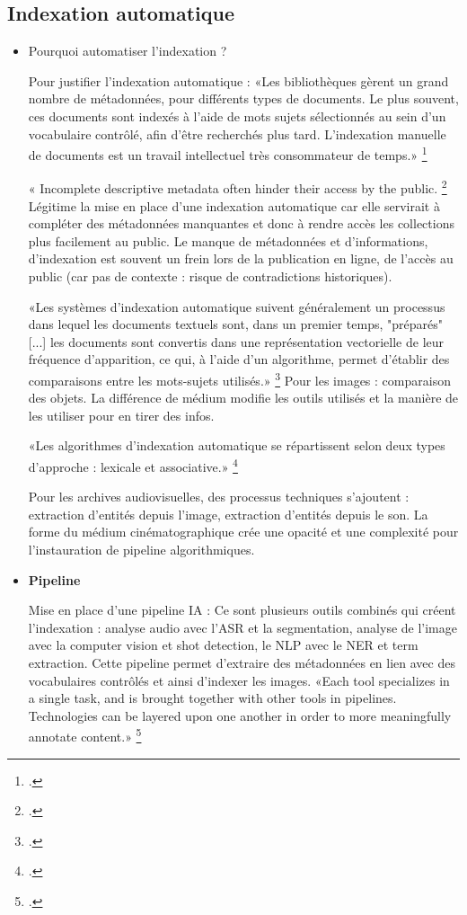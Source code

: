 \subsection{Indexation automatique}

\begin{itemize}
	\item Pourquoi automatiser l'indexation ?

Pour justifier l'indexation automatique : 
«Les bibliothèques gèrent un grand nombre de métadonnées, pour différents types de documents. Le plus souvent, ces documents sont indexés à l'aide de mots sujets sélectionnés au sein d'un vocabulaire contrôlé, afin d'être recherchés plus tard. L'indexation manuelle de documents est un travail intellectuel très consommateur de temps.»
\footcite[p.~21]{suominen2019a}

« Incomplete descriptive metadata often hinder their access by the public. \footcite{sullivan2025}
Légitime la mise en place d'une indexation automatique car elle servirait à compléter des métadonnées manquantes et donc à rendre accès les collections plus facilement au public. Le manque de métadonnées et d'informations, d'indexation est souvent un frein lors de la publication en ligne, de l'accès au public (car pas de contexte : risque de contradictions historiques). 

«Les systèmes d'indexation automatique suivent généralement un processus dans lequel les documents textuels sont, dans un premier temps, "préparés" [...] les documents sont convertis dans une représentation vectorielle de leur fréquence d'apparition, ce qui, à l'aide d'un algorithme, permet d'établir des comparaisons entre les mots-sujets utilisés.»
\footcite[p.~21]{suominen2019a}
Pour les images : comparaison des objets. La différence de médium modifie les outils utilisés et la manière de les utiliser pour en tirer des infos. 

«Les algorithmes d'indexation automatique se répartissent selon deux types d'approche : lexicale et associative.»
\footcite[p.~21]{suominen2019a}

Pour les archives audiovisuelles, des processus techniques s'ajoutent : extraction d'entités depuis l'image, extraction d'entités depuis le son. La forme du médium cinématographique crée une opacité et une complexité pour l'instauration de pipeline algorithmiques.

\item \textbf{Pipeline}

Mise en place d'une pipeline IA : 
Ce sont plusieurs outils combinés qui créent l'indexation : analyse audio avec l'ASR et la segmentation, analyse de l'image avec la computer vision et shot detection, le NLP avec le NER et term extraction. Cette pipeline permet d'extraire des métadonnées en lien avec des vocabulaires contrôlés et ainsi d'indexer les images. 
«Each tool specializes in a single task, and is brought together with other tools in pipelines. Technologies can be layered upon one another in order to more meaningfully annotate content.»
\footcite{2021}


\end{itemize}
